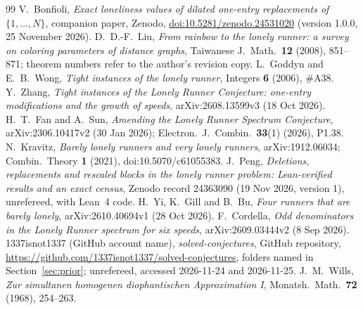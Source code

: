 \documentclass[11pt]{article}
\theoremstyle{definition}
\theoremstyle{remark}
\begin{document}
\begin{thebibliography}{99}
 V.~Bonfioli, \emph{Exact loneliness values of dilated one-entry replacements of $\{1,\dots,N\}$}, companion paper, Zenodo, \href{https://doi.org/10.5281/zenodo.24531020}{doi:10.5281/zenodo.24531020} (version 1.0.0, 25 November 2026).
 D.~D.-F.~Liu, \emph{From rainbow to the lonely runner: a survey on coloring parameters of distance graphs}, Taiwanese J.\ Math.\ \textbf{12} (2008), 851--871; theorem numbers refer to the author's revision copy.
 L.~Goddyn and E.~B.~Wong, \emph{Tight instances of the lonely runner}, Integers \textbf{6} (2006), \#A38.
 Y.~Zhang, \emph{Tight instances of the Lonely Runner Conjecture: one-entry modifications and the growth of speeds}, arXiv:2608.13599v3 (18 Oct 2026).
 H.~T.~Fan and A.~Sun, \emph{Amending the Lonely Runner Spectrum Conjecture}, arXiv:2306.10417v2 (30 Jan 2026); Electron.\ J.\ Combin.\ \textbf{33}(1) (2026), P1.38.
 N.~Kravitz, \emph{Barely lonely runners and very lonely runners}, arXiv:1912.06034; Combin.\ Theory \textbf{1} (2021), doi:10.5070/c61055383.
 J.~Peng, \emph{Deletions, replacements and rescaled blocks in the lonely runner problem: Lean-verified results and an exact census}, Zenodo record 24363090 (19 Nov 2026, version 1), unrefereed, with Lean~4 code.
 H.~Yi, K.~Gill and B.~Bu, \emph{Four runners that are barely lonely}, arXiv:2610.40694v1 (28 Oct 2026).
 F.~Cordella, \emph{Odd denominators in the Lonely Runner spectrum for six speeds}, arXiv:2609.03444v2 (8 Sep 2026).
 1337isnot1337 (GitHub account name), \emph{solved-conjectures}, GitHub repository, \url{https://github.com/1337isnot1337/solved-conjectures}, folders named in Section~\ref{sec:prior}; unrefereed, accessed 2026-11-24 and 2026-11-25.
 J.~M.~Wills, \emph{Zur simultanen homogenen diophantischen Approximation I}, Monatsh.\ Math.\ \textbf{72} (1968), 254--263.
\end{thebibliography}
\end{document}
